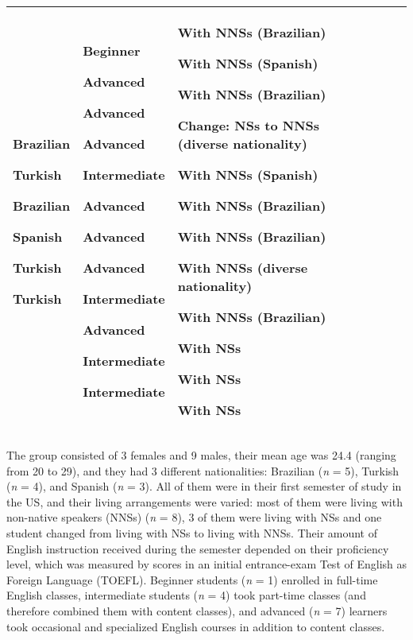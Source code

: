 \documentclass[12pt]{article}
\newenvironment{styleStandard}{\setlength\leftskip{0cm}\setlength\rightskip{0cm plus 1fil}\setlength\parindent{0cm}\setlength\parfillskip{0pt plus 1fil}\setlength\parskip{0in plus 1pt}\writerlistparindent\writerlistleftskip\leavevmode\normalfont\normalsize\writerlistlabel\ignorespaces}{\unskip\vspace{0.111in plus 0.0111in}\par}
\newcommand\writerlistleftskip{}
\newcommand\writerlistparindent{}
\newcommand\writerlistlabel{}
\begin{document}
\begin{center}
\begin{supertabular}{m{1.8cm}m{1.8cm}m{1.8cm}m{1.8cm}m{1.8cm}m{1.8cm}}
{\mdseries Brazilian}

{\mdseries Turkish}

{\mdseries Brazilian}

{\mdseries Spanish}

{\mdseries Turkish}

\mdseries Turkish &
{\mdseries Beginner}

{\mdseries Advanced}

{\mdseries Advanced}

{\mdseries Advanced}

{\mdseries Intermediate}

{\mdseries Advanced}

{\mdseries Advanced}

{\mdseries Advanced}

{\mdseries Intermediate}

{\mdseries Advanced}

{\mdseries Intermediate}

\mdseries Intermediate &
{\mdseries With NNSs (Brazilian)}

{\mdseries With NNSs (Spanish)}

{\mdseries With NNSs (Brazilian)}

{\mdseries Change: NSs to NNSs (diverse nationality)}

{\mdseries With NNSs (Spanish)}

{\mdseries With NNSs (Brazilian)}

{\mdseries With NNSs (Brazilian)}

{\mdseries With NNSs (diverse nationality)}

{\mdseries With NNSs (Brazilian)}

{\mdseries With NSs}

{\mdseries With NSs}

\mdseries With NSs\\\hline
\end{supertabular}
\end{center}
\begin{styleStandard}
The group consisted of 3 females and 9 males, their mean age was 24.4 (ranging from 20 to 29), and they had 3 different nationalities: Brazilian (\textit{n} = 5), Turkish (\textit{n} = 4), and Spanish (\textit{n} = 3). All of them were in their first semester of study in the US, and their living arrangements were varied: most of them were living with non-native speakers (NNSs) (\textit{n} = 8), 3 of them were living with NSs and one student changed from living with NSs to living with NNSs. Their amount of English instruction received during the semester depended on their proficiency level, which was measured by scores in an initial entrance-exam Test of English as Foreign Language (TOEFL). Beginner students (\textit{n} = 1) enrolled in full-time English classes, intermediate students (\textit{n} = 4) took part-time classes (and therefore combined them with content classes), and advanced (\textit{n} = 7) learners took occasional and specialized English courses in addition to content classes.
\end{styleStandard}
\end{document}
